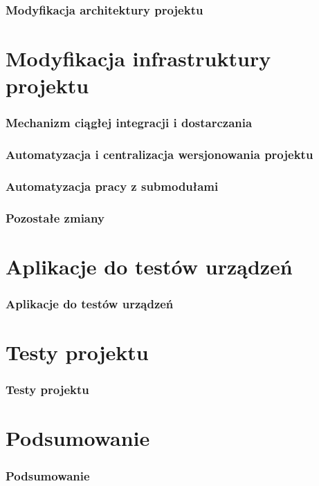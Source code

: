 \documentclass[10pt]{beamer}
\begin{document}
\begin{frame}
\frametitle{Modyfikacja architektury projektu}
\end{frame}


\section{Modyfikacja infrastruktury projektu}

\begin{frame}
\frametitle{Mechanizm ciągłej integracji i dostarczania}
\end{frame}

\begin{frame}
\frametitle{Automatyzacja i centralizacja wersjonowania projektu}
\end{frame}

\begin{frame}
\frametitle{Automatyzacja pracy z submodułami}
\end{frame}

\begin{frame}
\frametitle{Pozostałe zmiany}
\end{frame}

\section{Aplikacje do testów urządzeń}

\begin{frame}
\frametitle{Aplikacje do testów urządzeń}
\end{frame}

\section{Testy projektu}

\begin{frame}
\frametitle{Testy projektu}
\end{frame}

\section{Podsumowanie}

\begin{frame}
\frametitle{Podsumowanie}
\end{frame}
\end{document}

